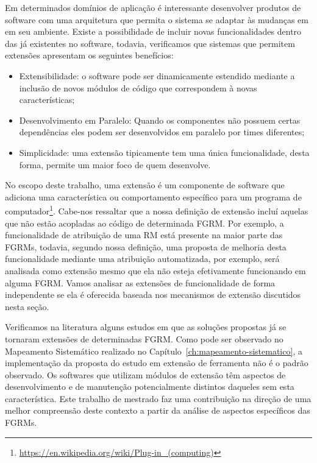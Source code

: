 Em determinados domínios de aplicação é interessante desenvolver produtos de
software com uma arquitetura que permita o sistema se adaptar às mudanças em em
seu ambiente. Existe a possibilidade de incluir novas funcionalidades dentro das
já existentes no software, todavia, verificamos que sistemas que permitem
extensões apresentam os seguintes benefícios:

\begin{itemize}
    \item Extensibilidade: o software pode ser dinamicamente estendido mediante
        a inclusão de novos módulos de código que correspondem à novas
        características;
    \item Desenvolvimento em Paralelo: Quando os componentes não possuem certas
        dependências eles podem ser desenvolvidos em paralelo por times
        diferentes;
    \item Simplicidade: uma extensão tipicamente tem uma única funcionalidade,
        desta forma, permite um maior foco de quem desenvolve.
\end{itemize}

No escopo deste trabalho, uma extensão é um componente de software que adiciona
uma característica ou comportamento específico para um programa de
computador\footnote{\url{https://en.wikipedia.org/wiki/Plug-in\_(computing)}}.
Cabe-nos ressaltar que a nossa definição de extensão incluí aquelas que não
estão acopladas ao código de determinada FGRM\@. Por exemplo, a funcionalidade
de atribuição de uma RM está presente na maior parte das FGRMs, todavia, segundo
nossa definição, uma proposta de melhoria desta funcionalidade mediante uma
atribuição automatizada, por exemplo, será analisada como extensão mesmo que ela
não esteja efetivamente funcionando em alguma FGRM\@. Vamos a\-na\-li\-sar as
extensões de funcionalidade de forma independente se ela é oferecida baseada nos
mecanismos de extensão discutidos nesta seção.

Verificamos na literatura alguns estudos em que as soluções propostas já se
tornaram extensões de determinadas FGRM\@. Como pode ser observado no Mapeamento
Sistemático realizado no Capítulo~\ref{ch:mapeamento-sistematico}, a
implementação da proposta do estudo em extensão de ferramenta não é o padrão
observado. Os softwares que utilizam módulos de extensão têm aspectos de
desenvolvimento e de manutenção potencialmente distintos daqueles sem esta
característica. Este trabalho de mestrado faz uma contribuição na direção de uma
melhor compreensão deste contexto a partir da análise de aspectos específicos
das FGRMs.


